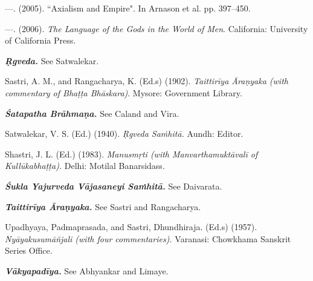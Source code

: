 \begin{thebibliography}{99}
  —. (2005). ``Axialism and Empire". In Arnason et al. pp. 397–450.

  —. (2006). \textit{The Language of the Gods in the World of Men}. California: University of California Press.

  \textbf{\textit{Ṛgveda.}} See Satwalekar.

  Sastri, A. M., and Rangacharya, K. (Ed.s) (1902). \textit{Taittirīya Āraṇyaka (with commentary of Bhaṭṭa Bhāskara)}. Mysore: Government Library.

  \textbf{\textit{Śatapatha Brāhmaṇa.}} See Caland and Vira.

  Satwalekar, V. S. (Ed.) (1940). \textit{Ṛgveda Saṁhitā.} Aundh: Editor.

  Shastri, J. L. (Ed.) (1983). \textit{Manusmṛti (with Manvarthamuktāvalī of Kullūkabhaṭṭa).} Delhi: Motilal Banarsidass.

  \textbf{\textit{Śukla Yajurveda Vājasaneyi Saṁhitā.}} See Daivarata.

  \textbf{\textit{Taittirīya Āraṇyaka.}} See Sastri and Rangacharya.

  Upadhyaya, Padmaprasada, and Sastri, Dhundhiraja. (Ed.s) (1957). \textit{Nyāyakusumāñjali (with four commentaries).} Varanasi: Chowkhama Sanskrit Series Office.

  \textbf{\textit{Vākyapadīya.}} See Abhyankar and Limaye.

 \end{thebibliography}

